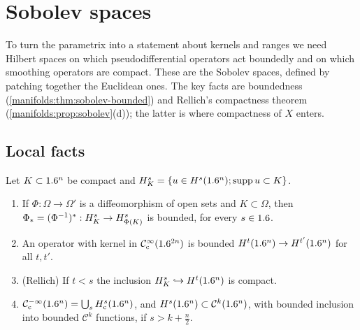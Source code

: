 \section{Sobolev spaces}\label{manifolds:sec:sobolev}
To turn the parametrix into a statement about kernels and ranges we need
Hilbert spaces on which pseudodifferential operators act boundedly and on
which smoothing operators are compact. These are the Sobolev spaces, defined
by patching together the Euclidean ones. The key facts are boundedness
(\cref{manifolds:thm:sobolev-bounded}) and Rellich's compactness theorem
(\cref{manifolds:prop:sobolev}(d)); the latter is where compactness of $X$
enters.

\subsection{Local facts}
\begin{lemma}\label{manifolds:lem:sobolev-local}
Let $K\subset1.6^n$ be compact and $H^{s}_K=\{u\in H^{s}(1.6^n);\operatorname{supp} u\subset K\}$.
\begin{enumerate}[label=\textup{(\alph*)}]
\item If $\Phi:\Omega\to\Omega'$ is a diffeomorphism of open sets and $K\subset\Omega$, then
$\Phi_*=(\Phi^{-1})^*:H^{s}_K\to H^{s}_{\Phi(K)}$ is bounded, for every $s\in1.6$.
\item An operator with kernel in $\mathcal{C}^\infty_{\mathrm{c}}(1.6^{2n})$ is bounded $H^{t}(1.6^n)\to H^{t'}(1.6^n)$
for all $t,t'$.
\item \textup{(Rellich)} If $t<s$ the inclusion $H^{s}_K\hookrightarrow H^{t}(1.6^n)$ is compact.
\item $\mathcal{C}^{-\infty}_{\mathrm{c}}(1.6^n)=\bigcup_sH^{s}_{\mathrm c}(1.6^n)$, and $H^{s}(1.6^n)\subset\mathcal C^k(1.6^n)$,
with bounded inclusion into bounded $\mathcal C^k$ functions, if $s>k+\frac n2$.
\end{enumerate}
\end{lemma}
